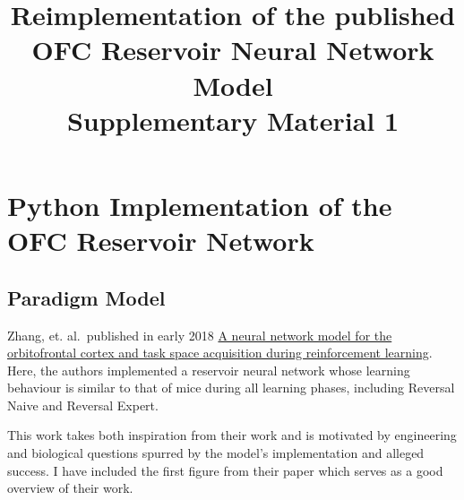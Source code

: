 \documentclass[11pt]{article}
\title{Reimplementation of the published OFC Reservoir Neural Network Model \\
    	Supplementary Material 1}
\begin{document}
    
    
    \maketitle
    
    

    
    \hypertarget{python-implementation-of-the-ofc-reservoir-network}{%
\section{Python Implementation of the OFC Reservoir
Network}\label{python-implementation-of-the-ofc-reservoir-network}}

\hypertarget{paradigm-model}{%
\subsection{Paradigm Model}\label{paradigm-model}}

Zhang, et. al.~published in early 2018
\href{https://journals.plos.org/ploscompbiol/article/file?id=10.1371/journal.pcbi.1005925\&type=printable}{A
neural network model for the orbitofrontal cortex and task space
acquisition during reinforcement learning}. Here, the authors
implemented a reservoir neural network whose learning behaviour is
similar to that of mice during all learning phases, including Reversal
Naive and Reversal Expert.

This work takes both inspiration from their work and is motivated by
engineering and biological questions spurred by the model's
implementation and alleged success. I have included the first figure
from their paper which serves as a good overview of their work.
\end{document}
